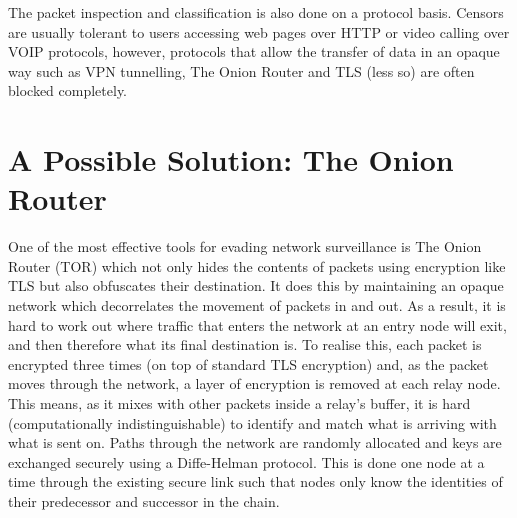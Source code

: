 \documentclass[ %
                    author={Samuel Russell},
                supervisor={Prof. Bogdan Warinschi},
                    degree={MEng},
                     title={Innocuous Ciphertexts},
                  subtitle={The DE-CENSOR Scheme},
                      type={research},
                      year={2018} ]{dissertation}
\begin{document}
The packet inspection and classification is also done on a protocol basis. Censors are usually tolerant to users accessing web pages over HTTP or video calling over VOIP protocols, however, protocols that allow the transfer of data in an opaque way such as VPN tunnelling, The Onion Router and TLS (less so) are often blocked completely.

\section{A Possible Solution: The Onion Router}

One of the most effective tools for evading network surveillance is The Onion Router (TOR) which not only hides the contents of packets using encryption like TLS but also obfuscates their destination. It does this by maintaining an opaque network which decorrelates the movement of packets in and out. As a result, it is hard to work out where traffic that enters the network at an entry node will exit, and then therefore what its final destination is. To realise this, each packet is encrypted three times (on top of standard TLS encryption) and, as the packet moves through the network, a layer of encryption is removed at each relay node. This means, as it mixes with other packets inside a relay's buffer, it is hard (computationally indistinguishable) to identify and match what is arriving with what is sent on. Paths through the network are randomly allocated and keys are exchanged securely using a Diffe-Helman protocol. This is done one node at a time through the existing secure link such that nodes only know the identities of their predecessor and successor in the chain.
\end{document}

